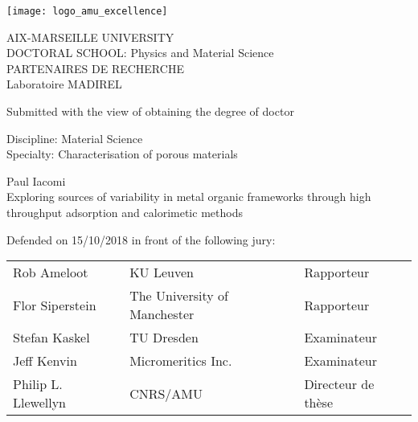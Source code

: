 \begin{titlepage}

\vspace*{-2cm}
\begin{center}
	\begin{minipage}[c]{0.70\linewidth}
		\raggedright\texttt{[image: logo\_amu\_excellence]}
	\end{minipage}\hfill
\end{center}

\begin{flushleft}
	\vspace{0.2cm}
	\LARGE AIX-MARSEILLE UNIVERSITY\\
	\vspace{0.2cm}
	\Large DOCTORAL SCHOOL: Physics and Material Science\\
	\vspace{0.2cm}
	\normalsize\textcolor{black!50}{PARTENAIRES DE RECHERCHE}\\
	\vspace{0.2cm}
	Laboratoire MADIREL\\
    \begin{center}
		\vspace{1.8cm}
		Submitted with the view of obtaining the degree of doctor\\
    \end{center}
	\vspace{0.5cm}
    Discipline: Material Science\\
    Specialty: Characterisation of porous materials\\
    \begin{center}
        \vspace{0.5cm}
        \Large Paul Iacomi\\
        \vspace{1cm}
            \large Exploring sources of variability in metal organic frameworks through high throughput adsorption and calorimetic methods\\
    \end{center}
	\vspace{3.4cm}
    \normalsize Defended on 15/10/2018 in front of the following jury:\\
\end{flushleft}

\vspace{0.4cm}

\begin{tabular}{lll}
	Rob Ameloot & KU Leuven & Rapporteur \\
    \vspace{0.08cm}
	Flor Siperstein & The University of Manchester & Rapporteur \\
    \vspace{0.08cm}
	Stefan Kaskel & TU Dresden & Examinateur \\
    \vspace{0.08cm}
	Jeff Kenvin & Micromeritics Inc. & Examinateur \\
    \vspace{0.08cm}
	Philip L. Llewellyn & CNRS/AMU & Directeur de thèse \\
\end{tabular}


\end{titlepage}
